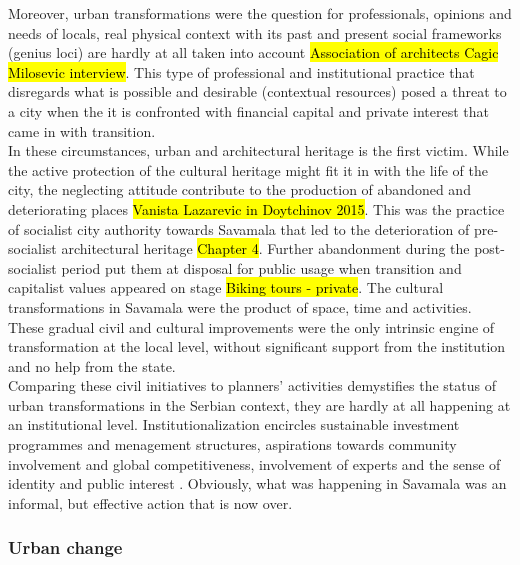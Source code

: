 \documentclass[11pt]{report}
\begin{document}
Moreover, urban transformations were the question for professionals, opinions and needs of locals, real physical context with its past and present social frameworks (genius loci) are hardly at all taken into account \hl{Association of architects Cagic Milosevic interview}.
This type of professional and institutional practice that disregards what is possible and desirable (contextual resources) posed a threat to a city when the it is confronted with financial capital and private interest that came in with transition.
\\
In these circumstances, urban and architectural heritage is the first victim.
While the active protection of the cultural heritage might fit it in with the life of the city, the neglecting attitude contribute to the production of abandoned and deteriorating places 
\hl{Vanista Lazarevic in Doytchinov 2015}.
This was the practice of socialist city authority towards Savamala that led to the deterioration of pre-socialist architectural heritage \hl{Chapter 4}. Further abandonment during the post-socialist period put them at disposal for public usage when transition and capitalist values appeared on stage \hl{Biking tours - private}.
The cultural transformations in Savamala were the product of space, time and activities. 
These gradual civil and cultural improvements were the only intrinsic engine of transformation at the local level, without significant support from the institution and no help from the state.
\\
Comparing these civil initiatives to planners' activities demystifies the status of urban transformations in the Serbian context, they are hardly at all happening at an institutional level.
Institutionalization encircles sustainable investment programmes and menagement structures, aspirations towards community involvement and global competitiveness, involvement of experts and the sense of identity and public interest \cite{Volic et al, 2012}. Obviously, what was happening in Savamala was an informal, but effective action that is now over.
    
\subsubsection{Urban change}
\end{document}
